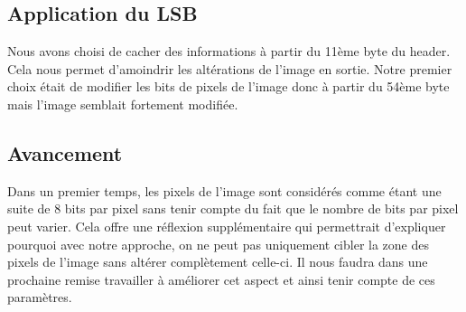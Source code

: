 \subsection {Application du LSB}
Nous avons choisi de cacher des informations à partir du 11ème byte du header. 
Cela nous permet d'amoindrir les altérations de l'image en sortie.
Notre premier choix était de modifier les bits de pixels de l'image donc à partir du 54ème byte mais l'image semblait fortement modifiée.

\subsection {Avancement}
Dans un premier temps, les pixels de l'image sont considérés comme étant une suite de 8 bits par pixel sans tenir compte du fait que le nombre de bits par pixel peut varier.
Cela offre une réflexion supplémentaire qui permettrait d'expliquer pourquoi avec notre approche, on ne peut pas uniquement cibler la zone des pixels de l'image sans altérer complètement celle-ci.
Il nous faudra dans une prochaine remise travailler à améliorer cet aspect et ainsi tenir compte de ces paramètres.
